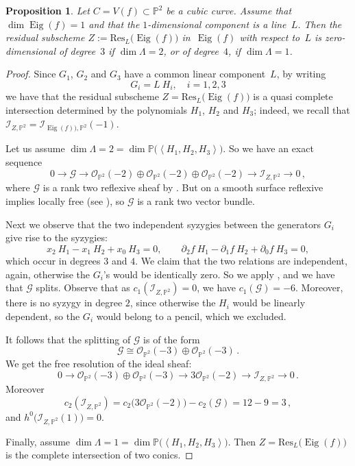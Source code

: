 \documentclass[11pt, a4paper, reqno, captions=tableheading,bibliography=totoc]{scrartcl}
\theoremstyle{plain}
\newtheorem{prop}[lemma]{Proposition}
\theoremstyle{definition}
\newcommand{\p}{\mathbb{P}}
\newcommand{\oo}{\mathcal{O}}
\newcommand{\Eig}[1]{\operatorname{Eig}\left( {#1} \right)}
\begin{document}
\begin{prop}\label{p2}
Let $C = V(f) \subset \p^2$ be a cubic curve.
Assume that $\dim \Eig{f} = 1$ and that the $1$-dimensional component is a line~$L$.
Then the residual subscheme $Z := \mathrm{Res}_L \bigl( \Eig{f} \bigr)$ in~$\Eig{f}$ with respect to~$L$ is zero-dimensional of degree~$3$ if $\dim \Lambda = 2$, or of degree~$4$, if $\dim \Lambda = 1$.
\end{prop}
\begin{proof}
Since $G_1$, $G_2$ and $G_3$ have a common linear component~$L$, by writing
\[
G_i=L \ H_i, \quad i=1,2,3
\]
we have that the residual subscheme $Z = \mathrm{Res}_L \bigl( \Eig{f} \bigr)$ is a quasi complete intersection
determined by the polynomials $H_1$, $H_2$ and $H_3$; indeed, we recall that $\mathcal{I}_{Z, \p^2} = \mathcal{I}_{\Eig{f}), \p^2} (-1)$.

Let us assume $\dim \Lambda = 2 = \dim \p \bigl( \left\langle H_1,H_2,H_3 \right\rangle \bigr)$.
So we have an exact sequence
\[
 0 \to \mathcal{G} \to \oo_{\p^2} (-2) \oplus \oo_{\p^2} (-2) \oplus \oo_{\p^2} (-2) \to \mathcal{I}_{Z,\p^2} \to 0 \,,
\]
where $\mathcal{G}$ is a rank two reflexive sheaf by \cite[Proposition 1]{Hartshorne1980}.
But on a smooth surface reflexive implies locally free (see \cite[Example~1.1.6]{Huybrechts2010}),
so $\mathcal{G}$ is a rank two vector bundle.

Next we observe that the two independent
syzygies between the generators $G_i$ give rise to the syzygies:
\[
x_2\ H_1 - x_1\ H_2 + x_0\ H_3=0, \qquad \partial_2 f\ H_1 - \partial_1 f \ H_2 +\partial_0 f \ H_3=0,
\]
which occur in degrees $3$ and $4$. We claim that the two relations are independent, again,
otherwise the $G_i$'s would be identically zero. So we apply \cite[Proposition~12]{Ellia2020}, and we have that $\mathcal {G}$ splits. Observe that as $c_1(\mathcal {I}_{Z,\p^2})=0$, we have $c_1(\mathcal {G})=-6$. Moreover, there is no syzygy in degree $2$, since
otherwise the $H_i$ would be linearly dependent, so the $G_i$ would belong to a pencil, which we excluded.

It follows that the splitting of $\mathcal{G}$ is of the form
%
\[
\mathcal{G} \cong \oo_{\p^2} (-3) \oplus \oo_{\p^2} (-3) \,.
\]
%
We get the free resolution of the ideal sheaf:
%
\[
0\to \oo_{\p^2} (-3)\oplus \oo_{\p^2} (-3) \to 3\oo_{\p^2} (-2)\to \mathcal {I}_{Z,\p^2} \to 0 \,.
\]
%
Moreover
%
\[
c_2 (\mathcal{I}_{Z,\p^2} ) = c_2 \bigl( 3\oo_{\p^2}(-2) \bigr) - c_2 (\mathcal{G}) = 12 - 9 = 3 \,,
\]
%
and $h^0 \bigl( \mathcal{I}_{Z,\p^2}(1) \bigr) = 0$.

Finally, assume $\dim \Lambda =1 =\dim \p \bigl( \left\langle H_1, H_2, H_3 \right\rangle \bigr)$.
Then $Z = \mathrm{Res}_L \bigl( \Eig{f} \bigr)$ is the complete intersection of two conics.
\end{proof}
\end{document}
